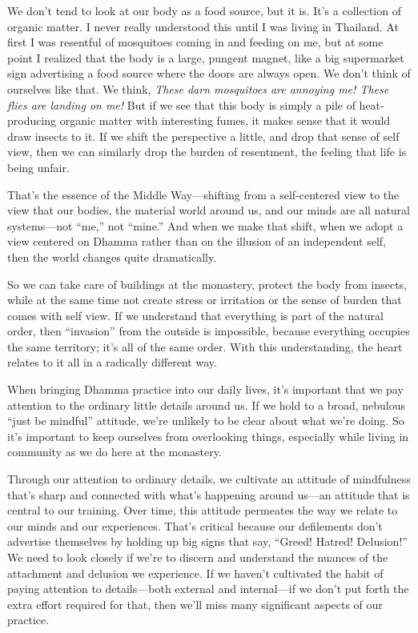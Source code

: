 We don't tend to look at our body as a food source, but it is. It's a 
collection of organic matter. I never really understood this until I 
was living in Thailand. At first I was resentful of mosquitoes coming 
in and feeding on me, but at some point I realized that the body is a 
large, pungent magnet, like a big supermarket sign advertising a food 
source where the doors are always open. We don't think of ourselves 
like that. We think, \emph{These darn mosquitoes are annoying me! These 
flies are landing on me!} But if we see that this body is simply a pile 
of heat-producing organic matter with interesting fumes, it makes sense 
that it would draw insects to it. If we shift the perspective a little, 
and drop that sense of self view, then we can similarly drop the burden 
of resentment, the feeling that life is being unfair.

That's the essence of the Middle Way---shifting from a self-centered 
view to the view that our bodies, the material world around us, and our 
minds are all natural systems---not ``me,'' not ``mine.'' And when we 
make that shift, when we adopt a view centered on Dhamma rather than on 
the illusion of an independent self, then the world changes quite 
dramatically.

So we can take care of buildings at the monastery, protect the body 
from insects, while at the same time not create stress or irritation or 
the sense of burden that comes with self view. If we understand that 
everything is part of the natural order, then ``invasion'' from the 
outside is impossible, because everything occupies the same territory; 
it's all of the same order. With this understanding, the heart relates 
to it all in a radically different way.


When bringing Dhamma practice into our daily lives, it's important that 
we pay attention to the ordinary little details around us. If we hold 
to a broad, nebulous ``just be mindful'' attitude, we're unlikely to be 
clear about what we're doing. So it's important to keep ourselves from 
overlooking things, especially while living in community as we do here 
at the monastery.

Through our attention to ordinary details, we cultivate an attitude of 
mindfulness that's sharp and connected with what's happening around 
us---an attitude that is central to our training. Over time, this 
attitude permeates the way we relate to our minds and our experiences. 
That's critical because our defilements don't advertise themselves by 
holding up big signs that say, ``Greed! Hatred! Delusion!'' We need to 
look closely if we're to discern and understand the nuances of the 
attachment and delusion we experience. If we haven't cultivated the 
habit of paying attention to details---both external and internal---if 
we don't put forth the extra effort required for that, then we'll miss 
many significant aspects of our practice.

